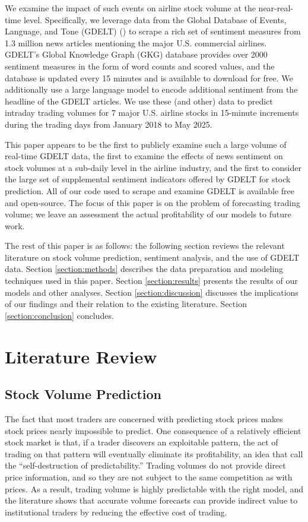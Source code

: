 \documentclass[12pt]{article}
\begin{document}
We examine the impact of such events on airline stock volume at the near-real-time level. Specifically, we leverage data from the Global Database of Events, Language, and Tone (GDELT) (\textcite{leetaru2013gdelt}) to scrape a rich set of sentiment measures from 1.3 million news articles mentioning the major U.S. commercial airlines. GDELT's Global Knowledge Graph (GKG) database provides over 2000 sentiment measures in the form of word counts and scored values, and the database is updated every 15 minutes and is available to download for free. We additionally use a large language model to encode additional sentiment from the headline of the GDELT articles. We use these (and other) data to predict intraday trading volumes for 7 major U.S. airline stocks in 15-minute increments during the trading days from January 2018 to May 2025.

This paper appears to be the first to publicly examine such a large volume of real-time GDELT data, the first to examine the effects of news sentiment on stock volumes at a sub-daily level in the airline industry, and the first to consider the large set of supplemental sentiment indicators offered by GDELT for stock prediction. All of our code used to scrape and examine GDELT is available free and open-source. The focus of this paper is on the problem of forecasting trading volume; we leave an assessment the actual profitability of our models to future work.

The rest of this paper is as follows: the following section reviews the relevant literature on stock volume prediction, sentiment analysis, and the use of GDELT data. Section \ref{section:methods} describes the data preparation and modeling techniques used in this paper. Section \ref{section:results} presents the results of our models and other analyses. Section \ref{section:discussion} discusses the implications of our findings and their relation to the existing literature. Section \ref{section:conclusion} concludes.

\section{Literature Review}
\label{section:litreview}

\subsection{Stock Volume Prediction}
The fact that most traders are concerned with predicting stock prices makes stock prices nearly impossible to predict. One consequence of a relatively efficient stock market is that, if a trader discovers an exploitable pattern, the act of trading on that pattern will eventually eliminate its profitability, an idea that \textcite{timmermann2004efficient} call the ``self-destruction of predictability.'' Trading volumes do not provide direct price information, and so they are not subject to the same competition as with prices. As a result, trading volume is highly predictable with the right model, and the literature shows that accurate volume forecasts can provide indirect value to institutional traders by reducing the effective cost of trading.
\end{document}
